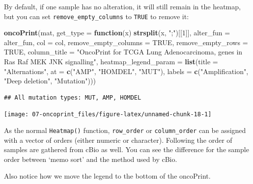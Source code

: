 \documentclass[]{book}
\newenvironment{Shaded}{\begin{snugshade}}{\end{snugshade}}
\newcommand{\KeywordTok}[1]{\textcolor[rgb]{0.13,0.29,0.53}{\textbf{#1}}}
\newcommand{\DataTypeTok}[1]{\textcolor[rgb]{0.13,0.29,0.53}{#1}}
\newcommand{\DecValTok}[1]{\textcolor[rgb]{0.00,0.00,0.81}{#1}}
\newcommand{\StringTok}[1]{\textcolor[rgb]{0.31,0.60,0.02}{#1}}
\newcommand{\OtherTok}[1]{\textcolor[rgb]{0.56,0.35,0.01}{#1}}
\newcommand{\ControlFlowTok}[1]{\textcolor[rgb]{0.13,0.29,0.53}{\textbf{#1}}}
\newcommand{\NormalTok}[1]{#1}
\theoremstyle{definition}
\theoremstyle{definition}
\theoremstyle{definition}
\theoremstyle{remark}
\begin{document}
By default, if one sample has no alteration, it will still remain in the
heatmap, but you can set \texttt{remove\_empty\_columns} to
\texttt{TRUE} to remove it:

\begin{Shaded}
\begin{Highlighting}[]
\KeywordTok{oncoPrint}\NormalTok{(mat, }\DataTypeTok{get_type =} \ControlFlowTok{function}\NormalTok{(x) }\KeywordTok{strsplit}\NormalTok{(x, }\StringTok{";"}\NormalTok{)[[}\DecValTok{1}\NormalTok{]],}
    \DataTypeTok{alter_fun =}\NormalTok{ alter_fun, }\DataTypeTok{col =}\NormalTok{ col, }
    \DataTypeTok{remove_empty_columns =} \OtherTok{TRUE}\NormalTok{, }\DataTypeTok{remove_empty_rows =} \OtherTok{TRUE}\NormalTok{,}
    \DataTypeTok{column_title =} \StringTok{"OncoPrint for TCGA Lung Adenocarcinoma, genes in Ras Raf MEK JNK signalling"}\NormalTok{,}
    \DataTypeTok{heatmap_legend_param =} \KeywordTok{list}\NormalTok{(}\DataTypeTok{title =} \StringTok{"Alternations"}\NormalTok{, }\DataTypeTok{at =} \KeywordTok{c}\NormalTok{(}\StringTok{"AMP"}\NormalTok{, }\StringTok{"HOMDEL"}\NormalTok{, }\StringTok{"MUT"}\NormalTok{), }
        \DataTypeTok{labels =} \KeywordTok{c}\NormalTok{(}\StringTok{"Amplification"}\NormalTok{, }\StringTok{"Deep deletion"}\NormalTok{, }\StringTok{"Mutation"}\NormalTok{)))}
\end{Highlighting}
\end{Shaded}

\begin{verbatim}
## All mutation types: MUT, AMP, HOMDEL
\end{verbatim}

\begin{center}\texttt{[image: 07-oncoprint\_files/figure-latex/unnamed-chunk-18-1]} \end{center}

As the normal \texttt{Heatmap()} function, \texttt{row\_order} or
\texttt{column\_order} can be assigned with a vector of orders (either
numeric or character). Following the order of samples are gathered from
cBio as well. You can see the difference for the sample order between
`memo sort' and the method used by cBio.

Also notice how we move the legend to the bottom of the oncoPrint.
\end{document}
